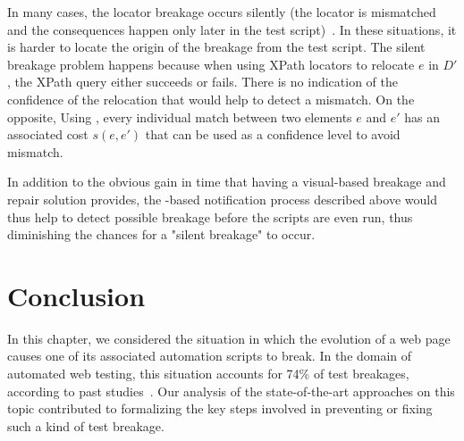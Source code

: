 In many cases, the locator breakage occurs silently (the locator is mismatched
and the consequences happen only later in the test
script)~\cite{stocco2018visual}. In these situations, it is harder to locate the
origin of the breakage from the test script. The silent breakage problem happens
because when using XPath locators to relocate $e$ in $D'$, the XPath query
either succeeds or fails. There is no indication of the confidence of the
relocation that would help to detect a mismatch. On the opposite, Using
\erratum{}, every individual match between two elements $e$ and $e'$ has an
associated cost $s(e, e')$ that can be used as a confidence level to avoid
mismatch.

In addition to the obvious gain in time that having a visual-based breakage and
repair solution provides, the \erratum-based notification process described
above would thus help to detect possible breakage before the scripts are even
run, thus diminishing the chances for a "silent breakage" to occur.


\section{Conclusion}\label{erratum:sec:conclusion}
In this chapter, we considered the situation in which the evolution of a web page causes one of its associated automation scripts to break.
In the domain of automated web testing, this situation accounts for 74\% of test breakages, according to past studies~\cite{hammoudi2016record}.
% 
Our analysis of the state-of-the-art approaches on this topic contributed to formalizing the key steps involved in preventing or fixing such a kind of test breakage.

